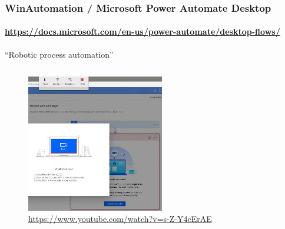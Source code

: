 \documentclass{beamer}
\begin{document}
    \begin{frame}
        \frametitle{WinAutomation / Microsoft Power Automate Desktop}
        \framesubtitle{\url{https://docs.microsoft.com/en-us/power-automate/desktop-flows/}}

        “Robotic process automation”

        \begin{columns}

            \begin{column}{6cm}
                \begin{figure}
                    \includegraphics[width=6cm]{Images/power_automate_screenshot.png}
                    \tiny{\url{https://www.youtube.com/watch?v=s-Z-Y4cErAE}}
                \end{figure}
            \end{column}
        \end{columns}
    \end{frame}
\end{document}
